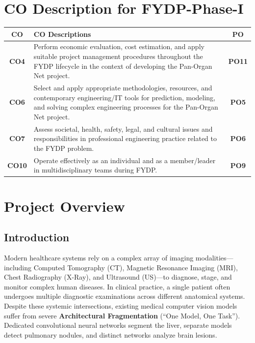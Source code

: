 \documentclass[11pt,a4paper]{article}
\begin{document}
\vspace{0.2cm}

\section*{CO Description for FYDP-Phase-I}
\begin{table}[h!]
\centering
\renewcommand{\arraystretch}{1.3}
\begin{tabularx}{\textwidth}{|c|X|c|}
\hline
\textbf{CO} & \textbf{CO Descriptions} & \textbf{PO} \\ \hline
\textbf{CO4} & Perform economic evaluation, cost estimation, and apply suitable project management procedures throughout the FYDP lifecycle in the context of developing the Pan-Organ Net project. & \textbf{PO11} \\ \hline
\textbf{CO6} & Select and apply appropriate methodologies, resources, and contemporary engineering/IT tools for prediction, modeling, and solving complex engineering processes for the Pan-Organ Net project. & \textbf{PO5} \\ \hline
\textbf{CO7} & Assess societal, health, safety, legal, and cultural issues and responsibilities in professional engineering practice related to the FYDP problem. & \textbf{PO6} \\ \hline
\textbf{CO10} & Operate effectively as an individual and as a member/leader in multidisciplinary teams during FYDP. & \textbf{PO9} \\ \hline
\end{tabularx}
\end{table}

\newpage

\section{Project Overview}

\subsection{Introduction}
Modern healthcare systems rely on a complex array of imaging modalities—including Computed Tomography (CT), Magnetic Resonance Imaging (MRI), Chest Radiography (X-Ray), and Ultrasound (US)—to diagnose, stage, and monitor complex human diseases. In clinical practice, a single patient often undergoes multiple diagnostic examinations across different anatomical systems. Despite these systemic intersections, existing medical computer vision models suffer from severe \textbf{Architectural Fragmentation} (``One Model, One Task''). Dedicated convolutional neural networks segment the liver, separate models detect pulmonary nodules, and distinct networks analyze brain lesions.
\end{document}
